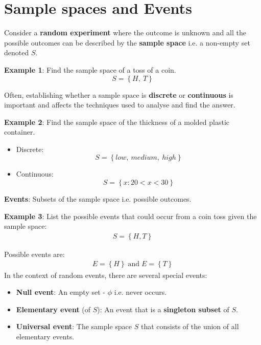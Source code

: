 \documentclass[10pt,a4paper]{article}
\begin{document}
\section{Sample spaces and Events}

Consider a \textbf{random experiment} where the outcome is unknown and all the possible
outcomes can be described by the \textbf{sample space} i.e. a non-empty set denoted $S$.

\textbf{Example 1}: Find the sample space of a toss of a coin.
$$
    S = \left\{H,\:T\right\}
$$

Often, establishing whether a sample space is \textbf{discrete} or \textbf{continuous} is important and
affects the techniques used to analyse and find the answer.

\textbf{Example 2}: Find the sample space of the thickness of a molded plastic container.
\begin{itemize}
    \item Discrete:
    $$
        S = \left\{low,\: medium,\: high\right\}
    $$

    \item Continuous:
    $$
        S =\left\{x: 20 < x < 30\right\}
    $$
\end{itemize}

\begin{tcolorbox}[breakable,colback=white]
\textbf{Events}: Subsets of the sample space i.e. possible outcomes.
\end{tcolorbox}

\textbf{Example 3}: List the possible events that could occur from a coin toss given the sample space:
\begin{align*}
    S = \left\{H, T\right\}
\end{align*}

Possible events are:
\begin{align*}
    E = \left\{H\right\} \; \text{and}\; E=\left\{T\right\}
\end{align*}
In the context of random events, there are several special events:
\begin{itemize}
    \item \textbf{Null event}: An empty set - $\phi$ i.e. never occurs.
    \item \textbf{Elementary event} (of $S$): An event that is a \textbf{singleton subset} of $S$.
    \item \textbf{Universal event}: The sample space $S$ that consists of the union of all elementary events.
\end{itemize}
\end{document}
